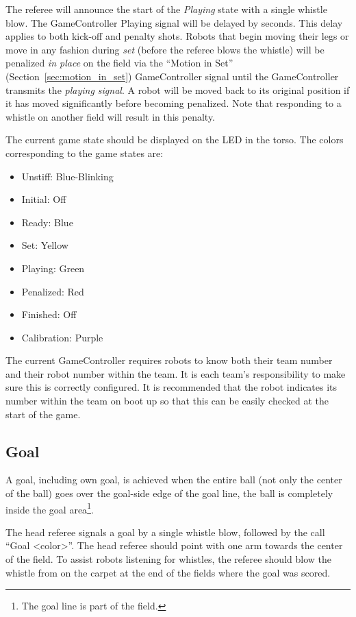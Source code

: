 The referee will announce the start of the \textit{Playing} state with a single whistle blow.
The GameController Playing signal will be delayed by \PlayingDelayTime seconds.
This delay applies to both kick-off and penalty shots.
Robots that begin moving their legs or move in any fashion during \emph{set} (\ie before the referee blows the whistle) will be penalized \textit{in place} on the field via the ``Motion in Set'' (\cf Section~\ref{sec:motion_in_set}) GameController signal until the GameController transmits the \emph{playing signal}. A robot will be moved back to its original position if it has moved significantly before becoming penalized.
Note that responding to a whistle on another field will result in this penalty.

The current game state should be displayed on the LED in the torso. The colors corresponding to the game states are:

\begin{itemize}
  \item Unstiff: Blue-Blinking
  \item Initial: Off
  \item Ready: Blue
  \item Set: Yellow
  \item Playing: Green
  \item Penalized: Red
  \item Finished: Off
  \item Calibration: Purple
\end{itemize}

The current GameController requires robots to know both their team number and their robot number within the team. It is each team's responsibility to make sure this is correctly configured. It is recommended that the robot indicates its number within the team on boot up so that this can be easily checked at the start of the game.

\subsection{Goal}
\label{sec:goal}
A goal, including own goal, is achieved when the entire ball (not only the center of the ball) goes over the goal-side edge of the goal line, \ie the ball is completely inside the goal area\footnote{The goal line is part of the field.}.

The head referee signals a goal by a single whistle blow, followed by the call ``Goal \textless color\textgreater''.
The head referee should point with one arm towards the center of the field.
To assist robots listening for whistles, the referee should blow the whistle from on the carpet at the end of the fields where the goal was scored.

